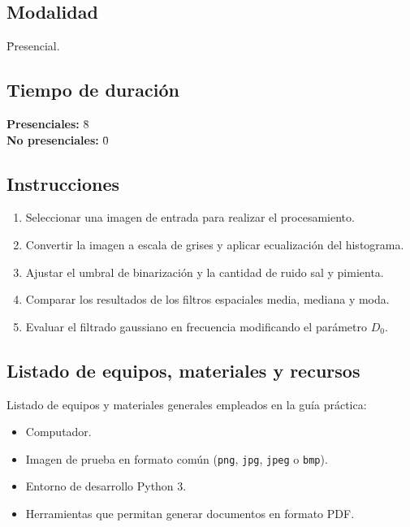 \documentclass[11pt]{article}
\begin{document}
\subsection{Modalidad}
\begin{tabbing}
    \hspace{1cm} \= Presencial.
\end{tabbing}

\subsection{Tiempo de duración}
\begin{tabbing}
    \hspace{1cm} \= \textbf{Presenciales:} \= 8 \\
    \hspace{1cm} \= \textbf{No presenciales:} \= 0
\end{tabbing}

\subsection{Instrucciones}
\begin{enumerate}
    \item Seleccionar una imagen de entrada para realizar el procesamiento.
    \item Convertir la imagen a escala de grises y aplicar ecualización del histograma.
    \item Ajustar el umbral de binarización y la cantidad de ruido sal y pimienta.
    \item Comparar los resultados de los filtros espaciales media, mediana y moda.
    \item Evaluar el filtrado gaussiano en frecuencia modificando el parámetro $D_0$.
\end{enumerate}

\subsection{Listado de equipos, materiales y recursos}
Listado de equipos y materiales generales empleados en la guía práctica:
\begin{itemize}
    \item Computador.
    \item Imagen de prueba en formato común (\texttt{png}, \texttt{jpg}, \texttt{jpeg} o \texttt{bmp}).
    \item Entorno de desarrollo Python 3.
    \item Herramientas que permitan generar documentos en formato PDF.
\end{itemize}
\end{document}
